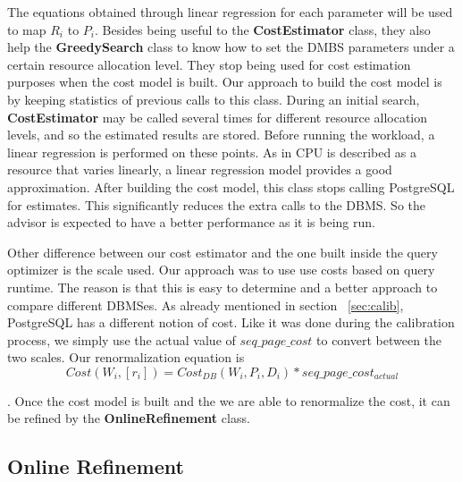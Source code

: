 The equations obtained through linear regression for each parameter will be used to map $R_{i}$ to $P_{i}$. Besides being useful to the \textbf{CostEstimator} class, they also help the \textbf{GreedySearch} class to know how to set the DMBS parameters under a certain resource allocation level. They stop being used for cost estimation purposes when the cost model is built. Our approach to build the cost model is by keeping statistics of previous calls to this class. During an initial search, \textbf{CostEstimator} may be called several times for different resource allocation levels, and so the estimated results are stored. Before running the workload, a linear regression is performed on these points. As in \cite{Soror:2008:AVM:1376616.1376711} CPU is described as a resource that varies linearly, a linear regression model provides a good approximation. After building the cost model, this class stops calling PostgreSQL for estimates. This significantly reduces the extra calls to the DBMS. So the advisor is 
expected to have a better performance as it is being run.

Other difference between our cost estimator and the one built inside the query optimizer is the scale used. Our approach was to use use costs based on query runtime. The reason is that this is easy to determine and a better approach to compare different DBMSes. As already mentioned in section ~\ref{sec:calib}, PostgreSQL has a different notion of cost. Like it was done during the calibration process, we simply use the actual value of $seq\_page\_cost$ to convert between the two scales. Our renormalization equation is
\[
 Cost(W_{i}, [r_{i}]) = Cost_{DB}(W_{i},P_{i},D_{i}) * seq\_page\_cost_{actual}
\]

. Once the cost model is built and the we are able to renormalize the cost, it can be refined by the \textbf{OnlineRefinement} class.

\subsection{Online Refinement}

